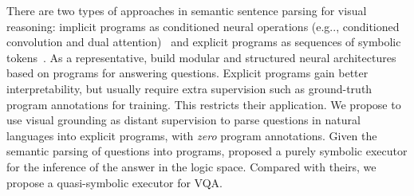 \documentclass{article} \usepackage{iclr2019_conference,times}
\makeatletter
\DeclareRobustCommand\onedot{\futurelet\@let@token\@onedot}
\def\@onedot{\ifx\@let@token.\else.\null\fi\xspace}
\def\eg{e.g\onedot} \def\Eg{E.g\onedot}
\makeatother
\begin{document}
There are two types of approaches in semantic sentence parsing for visual reasoning: implicit programs as conditioned neural operations (\eg, conditioned convolution and dual attention)~\citep{Perez2017Film,Hudson2018Compositional} and explicit programs as sequences of symbolic tokens~\citep{Andreas2016Learning,Johnson2017Inferring,Mascharka2018Transparency}. As a representative, \cite{Andreas2016Learning} build modular and structured neural architectures based on programs for answering questions.
Explicit programs gain better interpretability, but usually require extra supervision such as ground-truth program annotations for training. This restricts their application. We propose to use visual grounding as distant supervision to parse questions in natural languages into explicit programs, with {\it zero} program annotations. Given the semantic parsing of questions into programs, \cite{kexin} proposed a purely symbolic executor for the inference of the answer in the logic space. Compared with theirs, we propose a quasi-symbolic executor for VQA.
\end{document}

